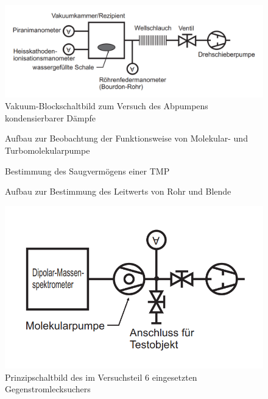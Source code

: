 \documentclass[12pt, a4paper]{scrartcl}
\begin{document}
		\begin{figure}[H]
			\centering
			\includegraphics[width=.5\paperwidth]{aufbau22}
			\caption{Vakuum-Blockschaltbild zum Versuch des Abpumpens kondensierbarer Dämpfe}
            \label{fig:anord2}
		\end{figure}
	
        \begin{figure}[H]
            \centering
            \caption{Aufbau zur Beobachtung der Funktionsweise von Molekular- und Turbomolekularpumpe}
            \label{fig:anord3}
        \end{figure}
    
        \begin{figure}[H]
            \centering
            \caption{Bestimmung des Saugvermögens einer TMP}
            \label{fig:anord4}
        \end{figure}
    
        \begin{figure}[H]
            \centering
            \caption{Aufbau zur Bestimmung des Leitwerts von Rohr und Blende}
            \label{fig:anord5}
        \end{figure}
    
		\begin{figure}[H]
			\centering
			\includegraphics[width=.3\paperwidth]{aufbau262}
			\caption{Prinzipschaltbild des im Versuchsteil 6 eingesetzten Gegenstromlecksuchers}
            \label{fig:anord6}
		\end{figure}
		
\end{document}
